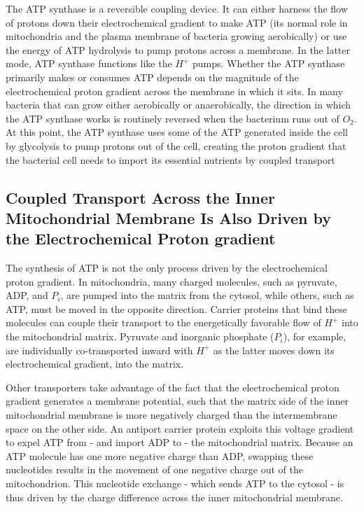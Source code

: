 The ATP synthase is a reversible coupling device. It can either harness
the flow of protons down their electrochemical gradient to make ATP
(its normal role in mitochondria and the plasma membrane of bacteria
growing aerobically) or use the energy of ATP hydrolysis to pump protons
across a membrane. In the latter mode, ATP synthase
functions like the $H^+$ pumps. Whether the ATP
synthase primarily makes or consumes ATP depends on the magnitude
of the electrochemical proton gradient across the membrane in which it
sits. In many bacteria that can grow either aerobically or anaerobically,
the direction in which the ATP synthase works is routinely reversed when
the bacterium runs out of $O_2$. At this point, the ATP synthase uses some of
the ATP generated inside the cell by glycolysis to pump protons out of the
cell, creating the proton gradient that the bacterial cell needs to import its
essential nutrients by coupled transport

\subsection{Coupled Transport Across the Inner Mitochondrial Membrane Is Also Driven by the Electrochemical Proton gradient}

The synthesis of ATP is not the only process driven by the electrochemical
proton gradient. In mitochondria, many charged molecules, such as
pyruvate, ADP, and $P_i$, are pumped into the matrix from the cytosol, while
others, such as ATP, must be moved in the opposite direction. Carrier
proteins that bind these molecules can couple their transport to the energetically
favorable flow of $H^+$ into the mitochondrial matrix. Pyruvate and
inorganic phosphate ($P_i$), for example, are individually co-transported
inward with $H^+$ as the latter moves down its electrochemical gradient,
into the matrix.

Other transporters take advantage of the fact that the electrochemical
proton gradient generates a membrane potential, such that the matrix
side of the inner mitochondrial membrane is more negatively charged
than the intermembrane space on the other side. An antiport carrier
protein exploits this voltage gradient to expel ATP from - and import
ADP to - the mitochondrial matrix. Because an ATP molecule has one
more negative charge than ADP, swapping these nucleotides results in
the movement of one negative charge out of the mitochondrion. This
nucleotide exchange - which sends ATP to the cytosol - is thus driven by
the charge difference across the inner mitochondrial membrane.


